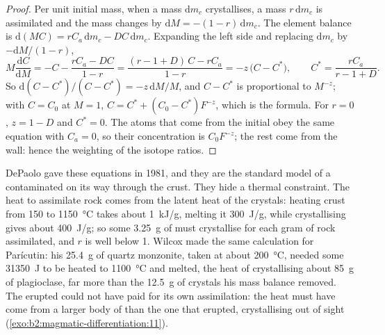 \begin{proof}
Per unit initial mass, when a mass $\mathrm dm_c$ crystallises, a mass
$r\,\mathrm dm_c$ is assimilated and the  mass changes by $\mathrm dM =
-(1-r)\,\mathrm dm_c$. The element balance is $\mathrm d(MC) = rC_a\,\mathrm dm_c -
DC\,\mathrm dm_c$. Expanding the left side and replacing $\mathrm dm_c$ by
$-\mathrm dM/(1-r)$,
\[
M\frac{\mathrm dC}{\mathrm dM} = -C - \frac{rC_a - DC}{1-r}
= \frac{(r - 1 + D)\,C - rC_a}{1 - r} = -z\,\bigl(C - C^*\bigr),
\qquad C^* = \frac{rC_a}{r - 1 + D}.
\]
So $\mathrm d(C - C^*)/(C - C^*) = -z\,\mathrm dM/M$, and $C - C^*$ is proportional
to $M^{-z}$; with $C = C_0$ at $M = 1$, $C = C^* + (C_0 - C^*)F^{-z}$, which is the
formula. For $r = 0$, $z = 1 - D$ and $C^* = 0$. The atoms that come from the
initial  obey the same equation with $C_a = 0$, so their concentration is
$C_0F^{-z}$; the rest come from the wall: hence the weighting of the isotope ratios.
\end{proof}

DePaolo gave these equations in 1981, and they are the standard model of a 
contaminated on its way through the crust. They hide a thermal constraint. The heat
to assimilate rock comes from the latent heat of the crystals: heating crust from
150 to \qty{1150}{\celsius} takes about \qty{1}{kJ/g}, melting it \qty{300}{J/g},
while crystallising  gives about \qty{400}{J/g}; so some \qty{3.25}{g} of
 must crystallise for each gram of rock assimilated, and $r$ is well below 1.
Wilcox made the same calculation for Parícutin: his \qty{25.4}{g} of quartz
monzonite, taken at about \qty{200}{\celsius}, needed some \qty{31350}{J} to be
heated to \qty{1100}{\celsius} and melted, the heat of crystallising about
\qty{85}{g} of plagioclase, far more than the \qty{12.5}{g} of crystals his mass
balance removed. The erupted  could not have paid for its own assimilation:
the heat must have come from a larger body of  than the one that erupted,
crystallising out of sight (\cref{exo:b2:magmatic-differentiation:11}).

